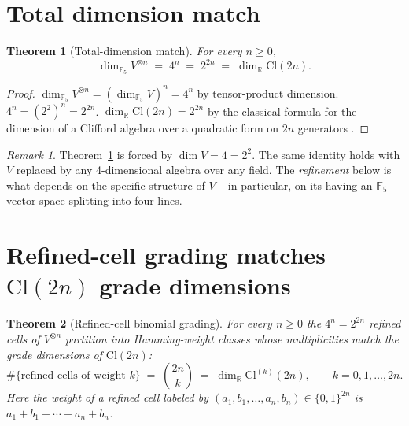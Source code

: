 \documentclass[11pt,reqno]{amsart}
\theoremstyle{plain}
\newtheorem{theorem}{Theorem}[section]
\theoremstyle{definition}
\theoremstyle{remark}
\newtheorem*{remark}{Remark}
\newcommand{\F}{\mathbb{F}}
\newcommand{\R}{\mathbb{R}}
\newcommand{\Cl}{\mathrm{Cl}}
\begin{document}
\section{Total dimension match}

\begin{theorem}[Total-dimension match]
\label{thm:total-dim}
For every $n \geq 0$,
\[
\dim_{\F_5} V^{\otimes n} \;=\; 4^n \;=\; 2^{2n} \;=\; \dim_\R \Cl(2n).
\]
\end{theorem}

\begin{proof}
$\dim_{\F_5} V^{\otimes n} = (\dim_{\F_5} V)^n = 4^n$ by tensor-product
dimension. $4^n = (2^2)^n = 2^{2n}$. $\dim_\R \Cl(2n) = 2^{2n}$ by the
classical formula for the dimension of a Clifford algebra over a
quadratic form on $2n$ generators
\cite[Ch.~I]{HesteneSobczyk1984}.
\end{proof}

\begin{remark}
Theorem~\ref{thm:total-dim} is forced by $\dim V = 4 = 2^2$.  The same
identity holds with $V$ replaced by any 4-dimensional algebra over any
field.  The \emph{refinement} below is what depends on the specific
structure of $V$ -- in particular, on its having an
$\F_5$-vector-space splitting into four lines.
\end{remark}

\section{Refined-cell grading matches $\Cl(2n)$ grade dimensions}

\begin{theorem}[Refined-cell binomial grading]
\label{thm:refined}
For every $n \geq 0$ the $4^n = 2^{2n}$ refined cells of
$V^{\otimes n}$ partition into Hamming-weight classes whose
multiplicities match the grade dimensions of $\Cl(2n)$:
\[
\#\{\text{refined cells of weight } k\} \;=\; \binom{2n}{k}
\;=\; \dim_\R \Cl^{(k)}(2n), \qquad k = 0, 1, \ldots, 2n.
\]
Here the \emph{weight} of a refined cell labeled by $(a_1, b_1, \ldots,
a_n, b_n) \in \{0,1\}^{2n}$ is $a_1 + b_1 + \cdots + a_n + b_n$.
\end{theorem}
\end{document}
